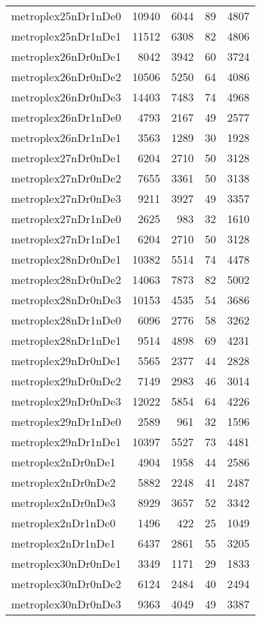 \documentclass[../../../thesis.tex]{subfiles}
\begin{document}
\begin{longtable}{lrrrr}
metroplex25nDr1nDe0 & 10940 & 6044 & 89 & 4807 \\
metroplex25nDr1nDe1 & 11512 & 6308 & 82 & 4806 \\
metroplex26nDr0nDe1 & 8042 & 3942 & 60 & 3724 \\
metroplex26nDr0nDe2 & 10506 & 5250 & 64 & 4086 \\
metroplex26nDr0nDe3 & 14403 & 7483 & 74 & 4968 \\
metroplex26nDr1nDe0 & 4793 & 2167 & 49 & 2577 \\
metroplex26nDr1nDe1 & 3563 & 1289 & 30 & 1928 \\
metroplex27nDr0nDe1 & 6204 & 2710 & 50 & 3128 \\
metroplex27nDr0nDe2 & 7655 & 3361 & 50 & 3138 \\
metroplex27nDr0nDe3 & 9211 & 3927 & 49 & 3357 \\
metroplex27nDr1nDe0 & 2625 & 983 & 32 & 1610 \\
metroplex27nDr1nDe1 & 6204 & 2710 & 50 & 3128 \\
metroplex28nDr0nDe1 & 10382 & 5514 & 74 & 4478 \\
metroplex28nDr0nDe2 & 14063 & 7873 & 82 & 5002 \\
metroplex28nDr0nDe3 & 10153 & 4535 & 54 & 3686 \\
metroplex28nDr1nDe0 & 6096 & 2776 & 58 & 3262 \\
metroplex28nDr1nDe1 & 9514 & 4898 & 69 & 4231 \\
metroplex29nDr0nDe1 & 5565 & 2377 & 44 & 2828 \\
metroplex29nDr0nDe2 & 7149 & 2983 & 46 & 3014 \\
metroplex29nDr0nDe3 & 12022 & 5854 & 64 & 4226 \\
metroplex29nDr1nDe0 & 2589 & 961 & 32 & 1596 \\
metroplex29nDr1nDe1 & 10397 & 5527 & 73 & 4481 \\
metroplex2nDr0nDe1 & 4904 & 1958 & 44 & 2586 \\
metroplex2nDr0nDe2 & 5882 & 2248 & 41 & 2487 \\
metroplex2nDr0nDe3 & 8929 & 3657 & 52 & 3342 \\
metroplex2nDr1nDe0 & 1496 & 422 & 25 & 1049 \\
metroplex2nDr1nDe1 & 6437 & 2861 & 55 & 3205 \\
metroplex30nDr0nDe1 & 3349 & 1171 & 29 & 1833 \\
metroplex30nDr0nDe2 & 6124 & 2484 & 40 & 2494 \\
metroplex30nDr0nDe3 & 9363 & 4049 & 49 & 3387 \\

\end{longtable}
\end{document}
